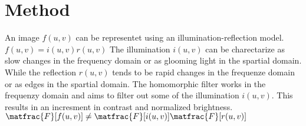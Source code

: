 \section{Method}

An image $f(u,v)$ can be representet using an illumination-reflection model. $f(u,v) = i(u,v) r(u,v)$
The illumination $i(u,v)$ can be charectarize as slow changes in the frequency domain or as glooming light in the spartial domain. While the reflection $r(u,v)$ tends to be rapid changes in the frequenze domain or as edges in the spartial domain. The homomorphic filter works in the frequenzy domain and aims to filter out some of the illumination $i(u,v)$. This results in an incresment in contrast and normalized brightness. 
\\


$\matfrac{F}[f(u,v)] \neq \matfrac{F}[i(u,v)] \matfrac{F}[r(u,v)] $